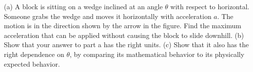 (a) A block is sitting on a wedge inclined at an angle $\theta$ with respect to horizontal.
Someone grabs the wedge and moves it horizontally with acceleration $a$. The motion is in the
direction shown by the arrow in the figure. Find the maximum acceleration
that can be applied without causing the block to slide downhill.\answercheck\hwendpart
(b) Show that your answer to part a has the right units.\hwendpart
(c) Show that it also has the right dependence on $\theta$, by comparing its   
mathematical behavior to its physically expected behavior.
